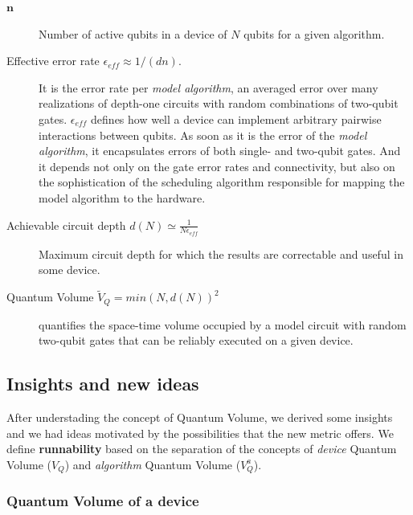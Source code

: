 \documentclass[11pt]{article}
\begin{document}
\begin{description}
\item[{\(\textbf{n}\)}] Number of active qubits in a device of \(N\) qubits for a given algorithm.
\end{description}


\begin{description}
\item[{Effective error rate \(\epsilon_{eff} \approx 1/(d n)\).}] It is the error rate per \emph{model algorithm}, an averaged error over many realizations of depth-one circuits with random combinations of two-qubit gates. \(\epsilon_{eff}\) defines how well a device can implement arbitrary pairwise interactions between qubits. As soon as it is the error of the \emph{model algorithm}, it encapsulates errors of both single- and two-qubit gates. And it depends not only on the gate error rates and connectivity, but also on the sophistication of the scheduling algorithm responsible for mapping the model algorithm to the hardware.

\item[{Achievable circuit depth \(d(N) \simeq \frac{1}{N \epsilon_{eff}}\)}] Maximum circuit depth for which the results are correctable and useful in some device.
\end{description}

\begin{description}
\item[{Quantum Volume \(\tilde{V}_Q = min (N, d(N))^2\)}] quantifies the space-time volume occupied by a model circuit with random two-qubit gates that can be reliably executed on a given device.
\end{description}

\subsection{Insights and new ideas}
\label{sec:org218d0b7}

After understading the concept of Quantum Volume, we derived some insights and we had ideas motivated by the possibilities that the new metric offers. 
We define \textbf{runnability} based on the separation of the concepts of \emph{device} Quantum Volume (\(V_Q\)) and \emph{algorithm} Quantum Volume (\(V^a_Q\)).

\subsubsection{Quantum Volume of a device}
\label{sec:org387f709}
\end{document}

